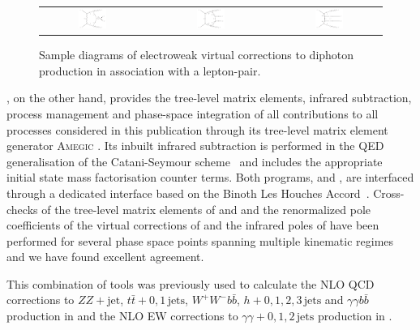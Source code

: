 \begin{figure}[t!]
  \begin{tabular}{ccccc}
    \includegraphics[width=0.288\textwidth]{diagrams/aaZ_V_2} & &
    \includegraphics[width=0.288\textwidth]{diagrams/aaZ_V_1} & &
    \includegraphics[width=0.288\textwidth]{diagrams/aaZ_V_3} \\
  \end{tabular}
  \caption{
    Sample diagrams of electroweak virtual corrections to diphoton 
    production in association with a lepton-pair.
    \label{fig:aaz:amps}
  }
\end{figure}

\Sherpa, on the other hand, provides the tree-level matrix 
elements, infrared subtraction, process management and phase-space 
integration of all contributions to all processes considered in 
this publication through its tree-level matrix element generator 
\textsc{Amegic} \cite{Krauss:2001iv}. 
Its inbuilt infrared subtraction is performed in the QED 
generalisation of the Catani-Seymour scheme~\cite{Catani:1996vz,
  Dittmaier:1999mb,Gleisberg:2007md,Kallweit:2014xda,
  Kallweit:2015dum,Kallweit:2017khh,Schonherr:2017xxx}
and includes the appropriate initial state mass factorisation 
counter terms.
Both programs, \Sherpa and \GoSam, are interfaced through a 
dedicated interface based on the 
Binoth Les Houches Accord~\cite{Binoth:2010xt,Alioli:2013nda}. 
Cross-checks of the tree-level matrix elements of \GoSam and 
\Sherpa and the renormalized pole coefficients of the virtual 
corrections of \GoSam and the infrared poles of \Sherpa have 
been performed for several phase space points spanning 
multiple kinematic regimes and we have found excellent 
agreement.

This combination of tools was previously used to calculate the 
NLO QCD corrections to $ZZ+\text{jet}$, $t\bar{t}+0,1\,\text{jets}$, 
$W^{+}W^{-}b\bar{b}$, $h+0,1,2,3\,\text{jets}$  and $\gamma\gamma b \bar{b}$ production 
in \cite{Binoth:2009wk,Hoeche:2013mua,Heinrich:2013qaa,
  Greiner:2015jha,Greiner:2016awe,Heinrich:2017bqp,Faeh:2017fpp} and the 
NLO EW corrections to $\gamma\gamma+0,1,2\,\text{jets}$ production 
in \cite{Chiesa:2017gqx}.
